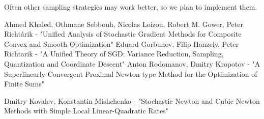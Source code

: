 \documentclass{article}
\begin{document}
Often other sampling strategies may work better, so we plan to implement them.

\newpage
 
 
\begin{thebibliography}{}
     Ahmed Khaled, Othmane Sebbouh, Nicolas Loizou, Robert M. Gower, Peter Richtárik - "Unified Analysis of Stochastic Gradient Methods for Composite Convex and Smooth Optimization"
     Eduard Gorbunov, Filip Hanzely, Peter Richtarik  -  "A Unified Theory of SGD: Variance Reduction, Sampling, Quantization and Coordinate Descent"
     Anton Rodomanov, Dmitry Kropotov - "A Superlinearly-Convergent Proximal Newton-type Method for the Optimization of Finite Sums"
    
     Dmitry Kovalev, Konstantin Mishchenko - "Stochastic Newton and Cubic Newton Methods with Simple Local Linear-Quadratic Rates"
\end{thebibliography}
\end{document}
